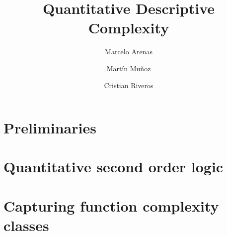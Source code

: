 \documentclass[a4paper]{article}
\begin{document}
\title{Quantitative Descriptive Complexity}
\author{Marcelo Arenas \and Mart\'in Mu\~noz \and Cristian Riveros}

\maketitle

\section{Preliminaries}
\label{sec:prelim}



\section{Quantitative second order logic}
\label{sec:logics}



\section{Capturing function complexity classes}
\label{sec:cap-comp}





\end{document}
